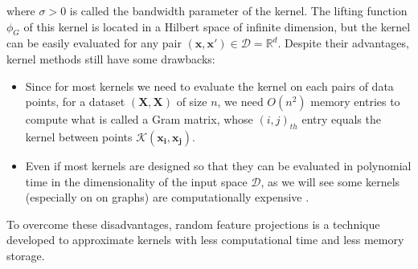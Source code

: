 where $\sigma>0$ is called the bandwidth parameter of the kernel. The lifting function $\phi_G$ of this kernel is located in a Hilbert space of infinite dimension, but the kernel can be easily evaluated for any pair $(\mathbf{x},\mathbf{x}')\in \mathcal{D}=\mathbb{R}^d$.\newline
Despite their advantages, kernel methods still have some drawbacks:
\begin{itemize}
    \item Since for most kernels we need to evaluate the kernel on each pairs of data points, for a dataset $(\mathbf{X},\mathbf{X})$ of size $n$, we need $O(n^2)$ memory entries to compute what is called a Gram matrix, whose $(i,j)_{th}$ entry equals the kernel between points $\mathcal{K}(\mathbf{x_i}, \mathbf{x_j})$.
    \item Even if most kernels are designed so that they can be evaluated in polynomial time in the dimensionality of the input space $\mathcal{D}$, as we will see some kernels (especially on on graphs) are computationally expensive \citep{graphlet_kernel}.
\end{itemize}
To overcome these disadvantages, random feature projections is a technique developed to approximate kernels with less computational time and less memory storage.

